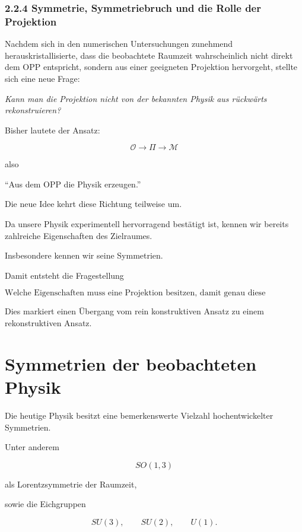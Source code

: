 \subsubsection{2.2.4 Symmetrie, Symmetriebruch und die Rolle der Projektion}

Nachdem sich in den numerischen Untersuchungen zunehmend herauskristallisierte, dass die beobachtete Raumzeit wahrscheinlich nicht direkt dem OPP entspricht, sondern aus einer geeigneten Projektion hervorgeht, stellte sich eine neue Frage:

\begin{center}
\emph{Kann man die Projektion nicht von der bekannten Physik aus rückwärts rekonstruieren?}
\end{center}

Bisher lautete der Ansatz:

\[
\mathcal{O}
\longrightarrow
\Pi
\longrightarrow
\mathcal{M}
\]

also

\begin{center}
``Aus dem OPP die Physik erzeugen.''
\end{center}

Die neue Idee kehrt diese Richtung teilweise um.

Da unsere Physik experimentell hervorragend bestätigt ist, kennen wir bereits zahlreiche Eigenschaften des Zielraumes.

Insbesondere kennen wir seine Symmetrien.

Damit entsteht die Fragestellung

\[
\boxed{
\text{Welche Eigenschaften muss eine Projektion besitzen,
damit genau diese Symmetrien emergieren?}
}
\]

Dies markiert einen Übergang vom rein konstruktiven Ansatz zu einem rekonstruktiven Ansatz.

\section*{Symmetrien der beobachteten Physik}

Die heutige Physik besitzt eine bemerkenswerte Vielzahl hochentwickelter Symmetrien.

Unter anderem

\[
SO(1,3)
\]

als Lorentzsymmetrie der Raumzeit,

sowie die Eichgruppen

\[
SU(3),
\qquad
SU(2),
\qquad
U(1).
\]

